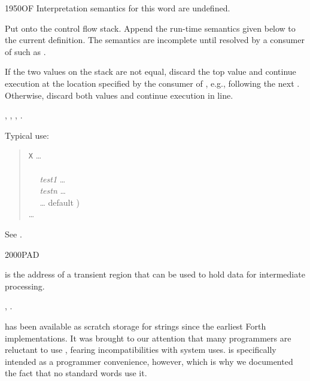 \begin{worddef}{1950}{OF}
\interpret
	Interpretation semantics for this word are undefined.

\compile

	Put  onto the control flow stack. Append the
	run-time semantics given below to the current definition.
	The semantics are incomplete until resolved by a consumer
	of  such as .

\runtime

	If the two values on the stack are not equal, discard the
	top value and continue execution at the location specified
	by the consumer of , e.g., following the next
	. Otherwise, discard both values and continue
	execution in line.

\see {},
	,
	,
	.

	\begin{rationale} %
		Typical use:
		\begin{quote}
			\word{:} \texttt{X} {\ldots} \\
			\tab {} \\
			\tab~~ \emph{test1}  {\ldots}  \\
			\tab~~ \emph{testn}  {\ldots}  \\
			\tab~~ {\ldots}  default ) \\
			\tab {} {\ldots} \\
			\word{;}
		\end{quote}
	\end{rationale}

	\begin{testing}
		See .
	\end{testing}
\end{worddef}


\begin{worddef}{2000}{PAD}
\item {}

	 is the address of a transient region that can
	be used to hold data for intermediate processing.

\see {},
	.

	\begin{rationale} %
		 has been available as scratch storage for strings
		since the earliest Forth implementations. It was brought to
		our attention that many programmers are reluctant to use
		, fearing incompatibilities with system uses.
		 is specifically intended as a programmer convenience,
		however, which is why we documented the fact that no standard
		words use it.
	\end{rationale}
\end{worddef}


